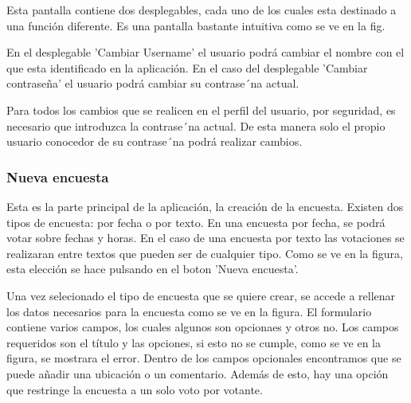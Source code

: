 \documentclass[a4paper, 12pt]{book}
\begin{document}
Esta pantalla contiene dos desplegables, cada uno de los cuales esta destinado a una funci\'on
diferente. Es una pantalla bastante intuitiva como se ve en la fig.

En el desplegable 'Cambiar Username' el usuario podr\'a cambiar el nombre con el que esta
identificado en la aplicaci\'on. En el caso del desplegable 'Cambiar contrase\~na' el usuario podr\'a
cambiar su contrase´na actual.

Para todos los cambios que se realicen en el perfil del usuario, por seguridad, es necesario
que introduzca la contrase´na actual. De esta manera solo el propio usuario conocedor de su
contrase´na podr\'a realizar cambios.


\subsubsection{Nueva encuesta}
\label{sec:nueva_encuesta}

Esta es la parte principal de la aplicaci\'on, la creaci\'on de la encuesta.
Existen dos tipos de encuesta: por fecha o por texto. En una encuesta por fecha, se podr\'a 
votar sobre fechas y horas. En el caso de una encuesta por texto las votaciones se realizaran
entre textos que pueden ser de cualquier tipo. Como se ve en la figura, esta elecci\'on se hace
pulsando en el boton 'Nueva encuesta'.

Una vez selecionado el tipo de encuesta que se quiere crear, se accede a rellenar los datos
necesarios para la encuesta como se ve en la figura. El formulario contiene varios campos, los
cuales algunos son opcionaes y otros no. Los campos requeridos son el t\'itulo y las opciones,
si esto no se cumple, como se ve en la figura, se mostrara el error. Dentro de los campos opcionales 
encontramos que se puede a\~nadir una ubicaci\'on o un comentario. Adem\'as de esto, hay una opci\'on
que restringe la encuesta a un solo voto por votante.
\end{document}
